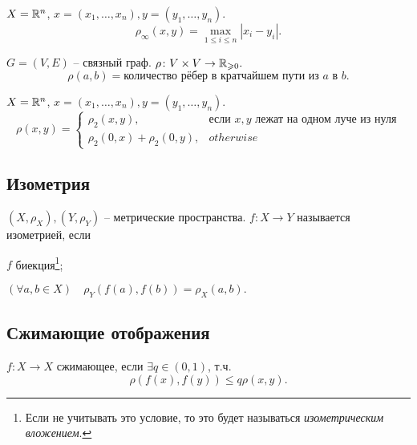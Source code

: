 \begin{example}
    $X = \mathbb R^n$, $x = (x_1, \ldots, x_n), y =(y_1, \ldots, y_n)$. \begin{equation}
        \rho_\infty(x,y) = \max_{1\leqslant i\leqslant n}|x_i - y_i|.
    \end{equation}
\end{example}

\begin{example}
    $G = (V, E)$ -- связный граф. $\rho\colon V\times V \to \mathbb R_{\geqslant 0}.$
    \begin{equation}
        \rho(a,b) = \text{количество рёбер в кратчайшем пути из } a \text{ в } b.
    \end{equation}
\end{example}
\begin{example}
    $X = \mathbb R^n$, $x = (x_1, \ldots, x_n), y =(y_1, \ldots, y_n)$.
    \begin{equation}
    \rho(x,y) = \begin{cases}
        \rho_2(x, y), &\text{если } x, y \text{ лежат на одном луче из нуля}\\
        \rho_2(0,x) + \rho_2(0, y), &otherwise
    \end{cases}
    \end{equation}
\end{example}
\subsection{Изометрия}
\begin{definition}[Изометрия]
    $(X, \rho_X), (Y, \rho_Y)$ -- метрические пространства. $f\colon X\to Y$ называется изометрией, если
    \begin{conditions}
        \item $f$ биекция\setcounter{footnote}{0}\footnote{Если не учитывать это условие, то это будет называться \emph{изометрическим вложением}.};
        \item $(\forall a, b \in X)\quad \rho_Y(f(a), f(b)) = \rho_X(a, b).$
    \end{conditions}
\end{definition}

\subsection{Сжимающие отображения}
\begin{definition}
    $f\colon X \to X$ сжимающее, если $\exists q \in (0, 1)$, т.ч. \[\rho(f(x), f(y)) \leqslant q \rho(x,y).\]
\end{definition}

